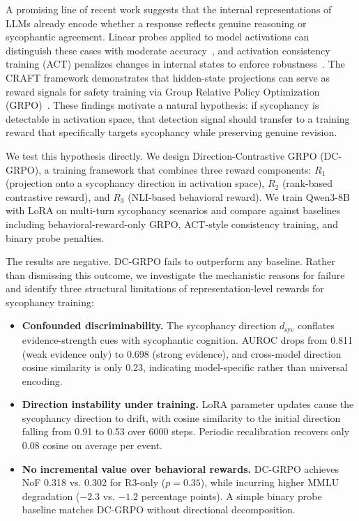 \documentclass[11pt,a4paper]{article}
\begin{document}
A promising line of recent work suggests that the internal representations of LLMs already encode whether a response reflects genuine reasoning or sycophantic agreement. Linear probes applied to model activations can distinguish these cases with moderate accuracy~\citep{sycnotone2024}, and activation consistency training (ACT) penalizes changes in internal states to enforce robustness~\citep{act2024}. The CRAFT framework demonstrates that hidden-state projections can serve as reward signals for safety training via Group Relative Policy Optimization (GRPO)~\citep{craft2024}. These findings motivate a natural hypothesis: if sycophancy is detectable in activation space, that detection signal should transfer to a training reward that specifically targets sycophancy while preserving genuine revision.

We test this hypothesis directly. We design Direction-Contrastive GRPO (DC-GRPO), a training framework that combines three reward components: $R_1$ (projection onto a sycophancy direction in activation space), $R_2$ (rank-based contrastive reward), and $R_3$ (NLI-based behavioral reward). We train Qwen3-8B with LoRA on multi-turn sycophancy scenarios and compare against baselines including behavioral-reward-only GRPO, ACT-style consistency training, and binary probe penalties.

The results are negative. DC-GRPO fails to outperform any baseline. Rather than dismissing this outcome, we investigate the mechanistic reasons for failure and identify three structural limitations of representation-level rewards for sycophancy training:

\begin{itemize}
    \item \textbf{Confounded discriminability.} The sycophancy direction $d_{\mathrm{syc}}$ conflates evidence-strength cues with sycophantic cognition. AUROC drops from 0.811 (weak evidence only) to 0.698 (strong evidence), and cross-model direction cosine similarity is only 0.23, indicating model-specific rather than universal encoding.
    \item \textbf{Direction instability under training.} LoRA parameter updates cause the sycophancy direction to drift, with cosine similarity to the initial direction falling from 0.91 to 0.53 over 6000 steps. Periodic recalibration recovers only 0.08 cosine on average per event.
    \item \textbf{No incremental value over behavioral rewards.} DC-GRPO achieves NoF 0.318 vs. 0.302 for R3-only ($p = 0.35$), while incurring higher MMLU degradation ($-2.3$ vs. $-1.2$ percentage points). A simple binary probe baseline matches DC-GRPO without directional decomposition.
\end{itemize}
\end{document}
